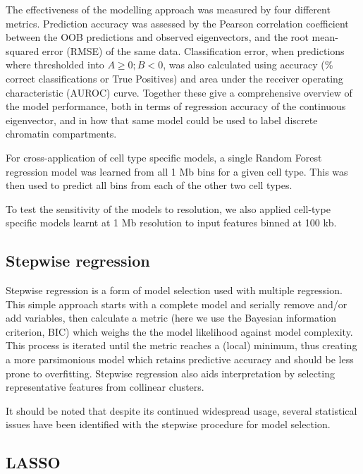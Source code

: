 \documentclass[a4paper,11pt,oneside]{book}
\begin{document}
The effectiveness of the modelling approach was measured by four
different metrics. Prediction accuracy was assessed by the Pearson
correlation coefficient between the OOB predictions and observed eigenvectors, and the root mean-squared
error (RMSE) of the same data. Classification error, when predictions
where thresholded into $A \geq 0; B < 0$, was also calculated using
accuracy (\% correct classifications or True Positives) and area under
the receiver operating characteristic (AUROC) curve. Together these give
a comprehensive overview of the model performance, both in terms of
regression accuracy of the continuous eigenvector, and in how that same
model could be used to label discrete chromatin compartments.

For cross-application of cell type specific models, a single Random
Forest regression model was learned from all 1 Mb bins for a given cell
type. This was then used to predict all bins from each of the other two
cell types.

To test the sensitivity of the models to resolution, we also applied cell-type specific models learnt at 1 Mb resolution to input features binned at 100 kb. 

\subsection{Stepwise regression}\label{meth:stepregress}

Stepwise regression is a form of model selection used with multiple regression. This simple approach starts with a complete model and serially remove and/or add variables, then calculate a metric (here we use the Bayesian information criterion, BIC) which weighs the the model likelihood against model complexity. This process is iterated until the metric reaches a (local) minimum, thus creating a more parsimonious model which retains predictive accuracy and should be less prone to overfitting. Stepwise regression also aids interpretation by selecting representative features from collinear clusters.\cite{Mantel1970} 

It should be noted that despite its continued widespread usage, several statistical issues have been identified with the stepwise procedure for model selection.\cite{Hurvich1990, Whittingham2006}

\subsection{LASSO}\label{meth:lasso}
\end{document}
